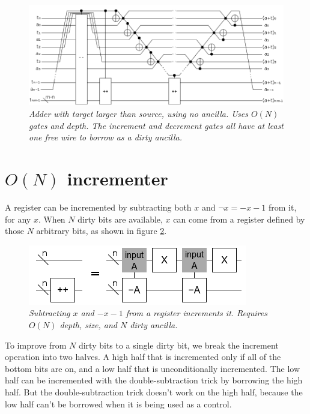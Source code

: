 \documentclass[twocolumn]{article}
\begin{document}
\begin{figure}
  \centering
  \includegraphics[width=\linewidth]{assets/inline-adder-into-large.png}
  \caption{\em
      Adder with target larger than source, using no ancilla.
      Uses $O(N)$ gates and depth.
      The increment and decrement gates all have at least one free wire to borrow as a dirty ancilla.}
  \label{fig:inline-adder-into-large}
\end{figure}

\section{$O(N)$ incrementer}

A register can be incremented by subtracting both $x$ and $\neg x = -x-1$ from it, for any $x$.
When $N$ dirty bits are available, $x$ can come from a register defined by those $N$ arbitrary bits, as shown in figure \ref{fig:increment-many-dirty}.

\begin{figure}
  \centering
  \includegraphics[width=\linewidth]{assets/increment-many-dirty.png}
  \caption{\em Subtracting $x$ and $-x-1$ from a register increments it. Requires $O(N)$ depth, size, and $N$ dirty ancilla.}
  \label{fig:increment-many-dirty}
\end{figure}

To improve from $N$ dirty bits to a single dirty bit, we break the increment operation into two halves.
A high half that is incremented only if all of the bottom bits are on, and a low half that is unconditionally incremented.
The low half can be incremented with the double-subtraction trick by borrowing the high half.
But the double-subtraction trick doesn't work on the high half, because the low half can't be borrowed when it is being used as a control.
\end{document}
